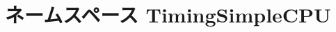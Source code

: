 \hypertarget{namespaceTimingSimpleCPU}{
\section{ネームスペース TimingSimpleCPU}
\label{namespaceTimingSimpleCPU}
}
